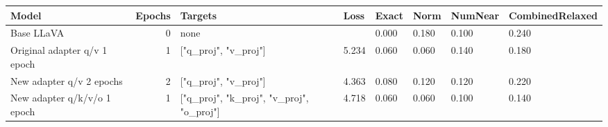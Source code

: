 \begin{tabular}{lrllllll}
\toprule
Model & Epochs & Targets & Loss & Exact & Norm & NumNear & CombinedRelaxed \\
\midrule
Base LLaVA & 0 & none &  & 0.000 & 0.180 & 0.100 & 0.240 \\
Original adapter q/v 1 epoch & 1 & ["q\_proj", "v\_proj"] & 5.234 & 0.060 & 0.060 & 0.140 & 0.180 \\
New adapter q/v 2 epochs & 2 & ["q\_proj", "v\_proj"] & 4.363 & 0.080 & 0.120 & 0.120 & 0.220 \\
New adapter q/k/v/o 1 epoch & 1 & ["q\_proj", "k\_proj", "v\_proj", "o\_proj"] & 4.718 & 0.060 & 0.060 & 0.100 & 0.140 \\
\bottomrule
\end{tabular}
